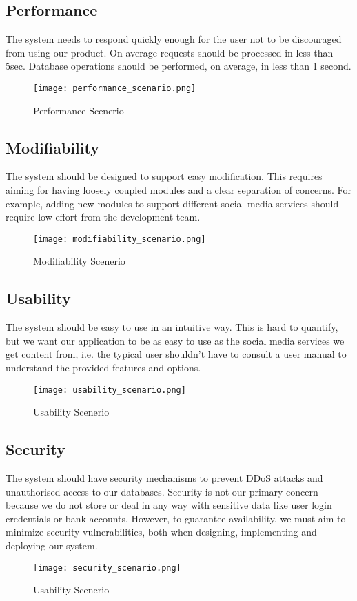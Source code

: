 \subsection{Performance}
The system needs to respond quickly enough for the user not to be discouraged
from using our product. On average requests should be processed in less than
5sec. Database operations should be performed, on average, in less than 1
second.
\begin{figure}[ht]
  \centering
  \texttt{[image: performance\_scenario.png]}
  \caption{Performance Scenerio}
\end{figure}

\subsection{Modifiability}
The system should be designed to support easy modification. This requires aiming
for having loosely coupled modules and a clear separation of concerns. For
example, adding new modules to support different social media services should
require low effort from the development team.
\begin{figure}[ht]
  \centering
  \texttt{[image: modifiability\_scenario.png]}
  \caption{Modifiability Scenerio}
\end{figure}

\newpage

\subsection{Usability}
The system should be easy to use in an intuitive way. This is hard to quantify,
but we want our application to be as easy to use as the social media services we
get content from, i.e. the typical user shouldn't have to consult a user manual
to understand the provided features and options.
\begin{figure}[ht]
  \centering
  \texttt{[image: usability\_scenario.png]}
  \caption{Usability Scenerio}
\end{figure}

\subsection{Security}
The system should have security mechanisms to prevent DDoS attacks and
unauthorised access to our databases. Security is not our primary concern
because we do not store or deal in any way with sensitive data like user login
credentials or bank accounts. However, to guarantee availability, we must aim to
minimize security vulnerabilities, both when designing, implementing and
deploying our system.
\begin{figure}[ht]
  \centering
  \texttt{[image: security\_scenario.png]}
  \caption{Usability Scenerio}
\end{figure}

